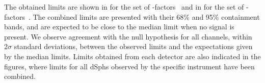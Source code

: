 The obtained limits are shown in  for the \GS set of \J-factors~\cite{Geringer-Sameth:2014yza} and in  for the \B set of \J-factors~\cite{Bonnivard:2014kza, Bonnivard:2015xpq}.
The combined limits are presented with their 68\% and 95\% containment bands, and are expected to be close to the median limit when no signal is present.
We observe agreement with the null hypothesis for all channels, within $2\sigma$ standard deviations, between the observed limits and the expectations given by the median limits.
Limits obtained from each detector are also indicated in the figures, where limits for all dSphs observed by the specific instrument have been combined.

\begin{figure}[h]
\end{figure}
